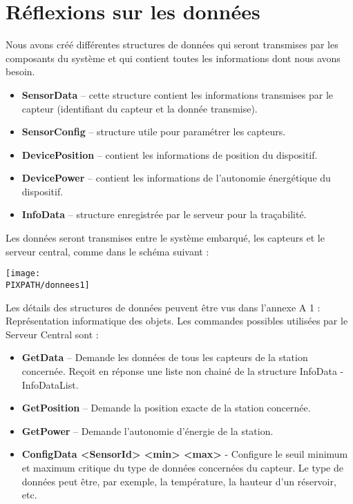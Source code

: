 \section{Réflexions sur les données}

Nous avons créé différentes structures de données qui seront transmises par les 
composants du système et qui contient toutes les informations dont nous avons 
besoin. \\

\begin{itemize}
\item \textbf{SensorData} – cette structure contient les informations transmises par le capteur (identifiant du capteur et la donnée transmise).
\item \textbf{SensorConfig} –  structure utile pour paramétrer les capteurs.
\item \textbf{DevicePosition} – contient les informations de position du dispositif.
\item \textbf{DevicePower} – contient les informations de l’autonomie énergétique du dispositif.
\item \textbf{InfoData} – structure enregistrée par le serveur pour la traçabilité.
\end{itemize}

Les données seront transmises entre le système embarqué, les capteurs et le serveur central, comme dans le schéma suivant : \\

    \begin{center}
    \texttt{[image: \\PIXPATH/donnees1]}
    \end{center}

Les détails des structures de données peuvent être vus dans l’annexe A 1 : Représentation informatique des objets.
Les commandes possibles utilisées par le Serveur Central sont : \\

\begin{itemize}
\item \textbf{GetData} – Demande les données de tous les capteurs de la station concernée. Reçoit en réponse une liste non chainé de la structure InfoData  - InfoDataList.
\item \textbf{GetPosition} – Demande la position exacte de la station concernée.
\item \textbf{GetPower} – Demande l’autonomie d'énergie de la station.
\item \textbf{ConfigData <SensorId> <min> <max>} - Configure le seuil minimum et maximum critique du type de données concernées du capteur. Le type de données peut être, par exemple,  la température, la hauteur d’un réservoir, etc.
\end{itemize}

